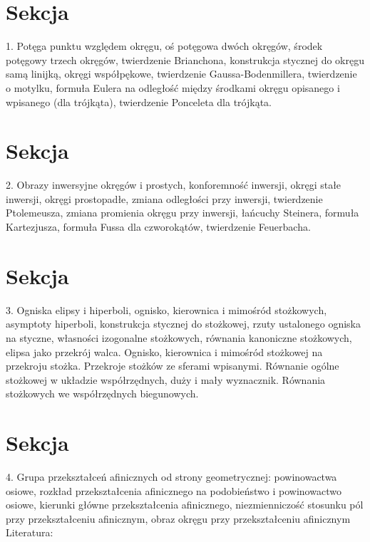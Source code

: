 \documentclass{LegrandOrangeBook}
\begin{document}
\section{Sekcja}
1. Potęga punktu względem okręgu, oś potęgowa dwóch okręgów, środek potęgowy trzech okręgów, twierdzenie Brianchona, konstrukcja stycznej do okręgu samą linijką, okręgi współpękowe, twierdzenie Gaussa-Bodenmillera, twierdzenie o motylku, formuła Eulera na odległość między środkami okręgu opisanego i wpisanego (dla trójkąta), twierdzenie Ponceleta dla trójkąta.

\section{Sekcja}
2. Obrazy inwersyjne okręgów i prostych, konforemność inwersji, okręgi stałe inwersji, okręgi prostopadłe, zmiana odległości przy inwersji, twierdzenie Ptolemeusza, zmiana promienia okręgu przy inwersji, łańcuchy Steinera, formuła Kartezjusza, formuła Fussa dla czworokątów, twierdzenie Feuerbacha.

\section{Sekcja}
3. Ogniska elipsy i hiperboli, ognisko, kierownica i mimośród stożkowych, asymptoty hiperboli, konstrukcja stycznej do stożkowej, rzuty ustalonego ogniska na styczne, własności izogonalne stożkowych, równania kanoniczne stożkowych, elipsa jako przekrój walca. Ognisko, kierownica i mimośród stożkowej na przekroju stożka. Przekroje stożków ze sferami wpisanymi. Równanie ogólne stożkowej w układzie współrzędnych, duży i mały wyznacznik. Równania stożkowych we współrzędnych biegunowych.

\section{Sekcja}
4. Grupa przekształceń afinicznych od strony geometrycznej: powinowactwa osiowe, rozkład przekształcenia afinicznego na podobieństwo i powinowactwo osiowe, kierunki główne przekształcenia afinicznego, niezmienniczość stosunku pól przy przekształceniu afinicznym, obraz okręgu przy przekształceniu afinicznym
Literatura: 	

\end{document}
